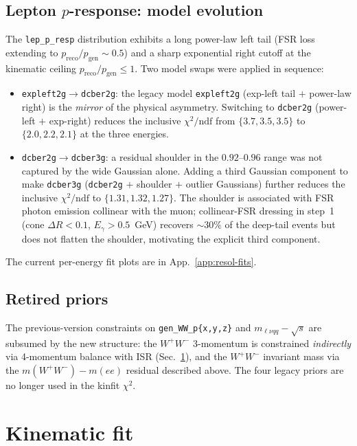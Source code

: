 \documentclass[11pt,a4paper]{article}
\newcommand{\sqs}{\ensuremath{\sqrt{s}}\xspace}
\newcommand{\WW}{\ensuremath{W^+W^-}\xspace}
\newcommand{\codename}[1]{\texttt{\small #1}}
\newcommand{\chitndf}{\ensuremath{\chi^2/\text{ndf}}\xspace}
\newcommand{\chisq}{\ensuremath{\chi^2}\xspace}
\begin{document}
\subsection{Lepton $p$-response: model evolution}\label{sec:lep-p-resp}

The \codename{lep\_p\_resp} distribution exhibits a long power-law left
tail (FSR loss extending to $p_\text{reco}/p_\text{gen}\sim 0.5$) and a
sharp exponential right cutoff at the kinematic ceiling
$p_\text{reco}/p_\text{gen}\le 1$. Two model swaps were applied in
sequence:
\begin{itemize}[leftmargin=*]
  \item \codename{expleft2g}$\to$\codename{dcber2g}: the legacy model
        \codename{expleft2g} (exp-left tail $+$ power-law right) is the
        \emph{mirror} of the physical asymmetry. Switching to
        \codename{dcber2g} (power-left $+$ exp-right) reduces the
        inclusive \chitndf from $\{3.7, 3.5, 3.5\}$ to
        $\{2.0, 2.2, 2.1\}$ at the three energies.
  \item \codename{dcber2g}$\to$\codename{dcber3g}: a residual shoulder
        in the $0.92$--$0.96$ range was not captured by the wide
        Gaussian alone. Adding a third Gaussian component to make
        \codename{dcber3g} (\codename{dcber2g} $+$ shoulder $+$ outlier
        Gaussians) further reduces the inclusive \chitndf to
        $\{1.31, 1.32, 1.27\}$. The shoulder is associated with FSR
        photon emission collinear with the muon; collinear-FSR dressing
        in step~1 (cone $\Delta R<0.1$, $E_\gamma>0.5$~GeV) recovers
        $\sim 30\%$ of the deep-tail events but does not flatten the
        shoulder, motivating the explicit third component.
\end{itemize}
The current per-energy fit plots are in App.~\ref{app:resol-fits}.

\subsection{Retired priors}\label{sec:retired}

The previous-version constraints on
\codename{gen\_WW\_p\{x,y,z\}} and $m_{\ell\nu qq}-\sqs$ are subsumed
by the new structure: the \WW 3-momentum is constrained \emph{indirectly}
via 4-momentum balance with ISR (Sec.~\ref{sec:kinfit}), and the
\WW invariant mass via the $m(\WW)-m(ee)$ residual described above.
The four legacy priors are no longer used in the kinfit \chisq.


\section{Kinematic fit}\label{sec:kinfit}
\end{document}
